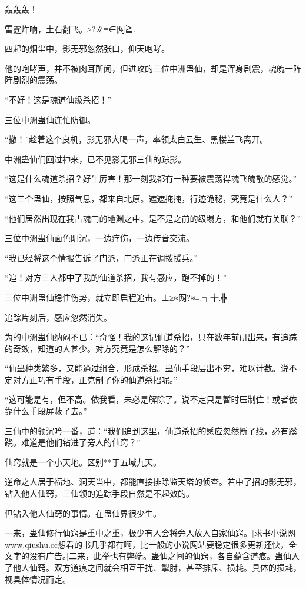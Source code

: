 
\begin{this_body}

轰轰轰！

雷霆炸响，土石翻飞。≥?∥≡∈网≧.

四起的烟尘中，影无邪忽然张口，仰天咆哮。

他的咆哮声，并不被肉耳所闻，但进攻的三位中洲蛊仙，却是浑身剧震，魂魄一阵阵剧烈的震荡。

“不好！这是魂道仙级杀招！”

三位中洲蛊仙连忙防御。

“撤！”趁着这个良机，影无邪大喝一声，率领太白云生、黑楼兰飞离开。

中洲蛊仙们回过神来，已不见影无邪三仙的踪影。

“这是什么魂道杀招？好生厉害！那一刻我都有一种要被震荡得魂飞魄散的感觉。”

“这三个蛊仙，按照气息，都来自北原。遮遮掩掩，行迹诡秘，究竟是什么人？”

“他们居然出现在我古魂门的地渊之中。是不是之前的级塌方，和他们就有关联？”

三位中洲蛊仙面色阴沉，一边疗伤，一边传音交流。

“我已经将这个情报告诉了门派，门派正在调拨援兵。”

“追！对方三人都中了我的仙道杀招，我有感应，跑不掉的！”

三位中洲蛊仙稳住伤势，就立即启程追击。⊥≥≈网?≈≡.┭╈.╬

追踪片刻后，感应忽然消失。

为的中洲蛊仙纳闷不已：“奇怪！我的这记仙道杀招，只在数年前研出来，有追踪的奇效，知道的人甚少。对方究竟是怎么解除的？”

“仙蛊种类繁多，又能通过组合，形成杀招。蛊仙手段层出不穷，难以计数。说不定对方正巧有手段，正克制了你的仙道杀招呢。”

“这可能是有，但不高。依我看，未必是解除了。说不定只是暂时压制住！或者依靠什么手段屏蔽了去。”

三仙中的领沉吟一番，道：“我们追到这里，仙道杀招的感应忽然断了线，必有蹊跷。难道是他们钻进了旁人的仙窍？”

仙窍就是一个小天地。区别**于五域九天。

逆命之人居于福地、洞天当中，都能直接排除监天塔的侦查。若中了招的影无邪，钻入他人仙窍，三仙领的追踪手段自然是不起效的。

但钻入他人仙窍的事情。在蛊仙界很少生。

一来，蛊仙修行仙窍是重中之重，极少有人会将旁人放入自家仙窍。[求书小说网www.qiushu.cc想看的书几乎都有啊，比一般的小说网站要稳定很多更新还快，全文字的没有广告。]二来，此举也有弊端。蛊仙之间的仙窍，各自蕴含道痕。蛊仙入了他人仙窍。双方道痕之间就会相互干扰、掣肘，甚至排斥、损耗。具体的损耗，视具体情况而定。


\end{this_body}
